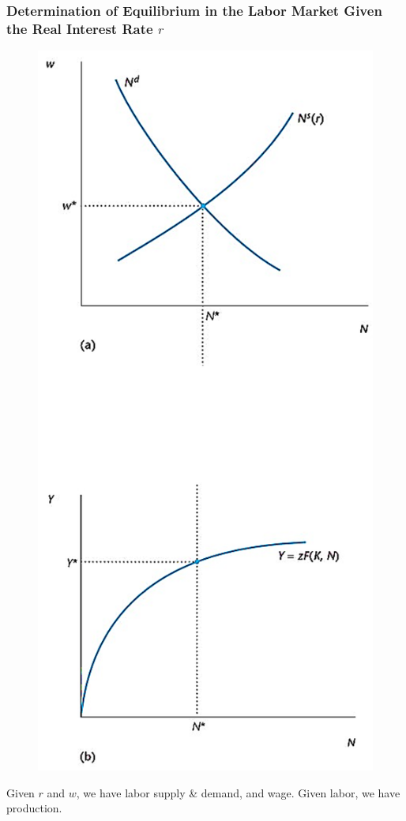 \documentclass{beamer}
\begin{document}
\begin{frame}
\frametitle[alignment=center]{Determination of Equilibrium in the Labor Market Given the Real Interest Rate $r$}
\begin{figure}
\centering
\includegraphics[scale=0.6]{Figures/W_Fig_11pt14.png}
\end{figure}
Given $r$ and $w$, we have labor supply \& demand, and wage. Given labor, we have production.  
\end{frame}
\end{document}
